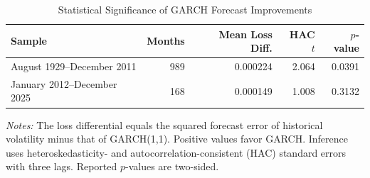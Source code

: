 \begin{table}[htbp]
\centering
\caption{Statistical Significance of GARCH Forecast Improvements}
\label{tab:garch_forecast_significance}
\small
\begin{tabular}{lrrrr}
\toprule
Sample & Months & Mean Loss Diff. & HAC $t$ & $p$-value \\
\midrule
August 1929--December 2011 & 989 & 0.000224 & 2.064 & 0.0391 \\
January 2012--December 2025 & 168 & 0.000149 & 1.008 & 0.3132 \\
\bottomrule
\end{tabular}
\par\vspace{0.3em}
\begin{minipage}{0.9\linewidth}
\footnotesize\textit{Notes:} The loss differential equals the squared forecast error of historical volatility minus that of GARCH(1,1). Positive values favor GARCH. Inference uses heteroskedasticity- and autocorrelation-consistent (HAC) standard errors with three lags. Reported $p$-values are two-sided.
\end{minipage}
\end{table}
